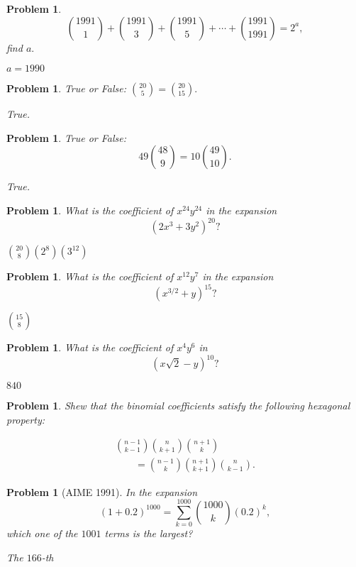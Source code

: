 \documentclass[11pt, openany]{book}
\theoremstyle{change} \theoremheaderfont{\blue\sffamily\bfseries}
\newtheorem{pro}[thm]{Problem}
\theoremstyle{nonumberplain} \theoremheaderfont{\sffamily\bfseries}
\def\binom#1#2{{#1\choose#2}}
\newcommand{\í}{\'{\i}}
\begin{document}
\begin{multicols}{2}
\begin{pro}
$$\binom{1991}{1} + \binom{1991}{3} + \binom{1991}{5} + \cdots + \binom{1991}{1991} = 2^a,$$
find $a.$
\begin{answer} $a=1990$ \end{answer}
\end{pro}
\begin{pro} True or False:
$\binom{20}{5} = \binom{20}{15}.$
\begin{answer} True. \end{answer}
\end{pro}
\begin{pro} True or False:
$$49\binom{48}{9} = 10\binom{49}{10}.$$
\begin{answer} True. \end{answer}
\end{pro}
\begin{pro} What is the coefficient of $x^{24} y^{24}$ in the expansion
$$(2x^3 + 3y^2)^{20}? $$
\begin{answer}  $\binom{20}{8}(2^8)(3^{12})$ \end{answer}
\end{pro}
\begin{pro} What is the coefficient of $x^{12} y^7$ in the expansion
$$(x^{3/2} + y)^{15}?$$
 \begin{answer} $\binom{15}{8}$ \end{answer}

\end{pro}
\begin{pro} What is the coefficient of $x^4 y^6$ in $$(x\sqrt{2} -
y)^{10}?$$
\begin{answer} $840$
  \end{answer}
\end{pro}
\begin{pro} Shew that the binomial coefficients satisfy the following
hexagonal property: \end{pro}
$$\begin{array}{l}\binom{n - 1}{k - 1}\binom{n}{k + 1}\binom{n + 1}{k}\\ \qquad = \binom{n -
1}{k}\binom{n + 1}{k + 1}\binom{n}{k - 1}. \end{array}$$
\begin{pro}[AIME 1991] In the expansion $$(1 + 0.2)^{1000} =
\displaystyle{\sum_{k = 0} ^{1000} \binom{1000}{k} (0.2)^k},$$
which one of the $1001$ terms is the largest?
\begin{answer} The $166$-th \end{answer}
 \end{pro}


\end{multicols}
\end{document}
